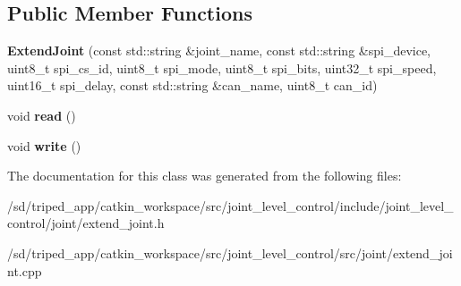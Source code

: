 \subsection*{Public Member Functions}
\begin{DoxyCompactItemize}
\item 
\mbox{\label{classExtendJoint_a115a7b5763d4496e9c365614241b2351}} 
{\bfseries Extend\+Joint} (const std\+::string \&joint\+\_\+name, const std\+::string \&spi\+\_\+device, uint8\+\_\+t spi\+\_\+cs\+\_\+id, uint8\+\_\+t spi\+\_\+mode, uint8\+\_\+t spi\+\_\+bits, uint32\+\_\+t spi\+\_\+speed, uint16\+\_\+t spi\+\_\+delay, const std\+::string \&can\+\_\+name, uint8\+\_\+t can\+\_\+id)
\item 
\mbox{\label{classExtendJoint_a703426ab8a4047bb7a6087ffff734b5d}} 
void {\bfseries read} ()
\item 
\mbox{\label{classExtendJoint_aaaddc50f230254a001ce8b3f56064371}} 
void {\bfseries write} ()
\end{DoxyCompactItemize}


The documentation for this class was generated from the following files\+:\begin{DoxyCompactItemize}
\item 
/sd/triped\+\_\+app/catkin\+\_\+workspace/src/joint\+\_\+level\+\_\+control/include/joint\+\_\+level\+\_\+control/joint/extend\+\_\+joint.\+h\item 
/sd/triped\+\_\+app/catkin\+\_\+workspace/src/joint\+\_\+level\+\_\+control/src/joint/extend\+\_\+joint.\+cpp\end{DoxyCompactItemize}
